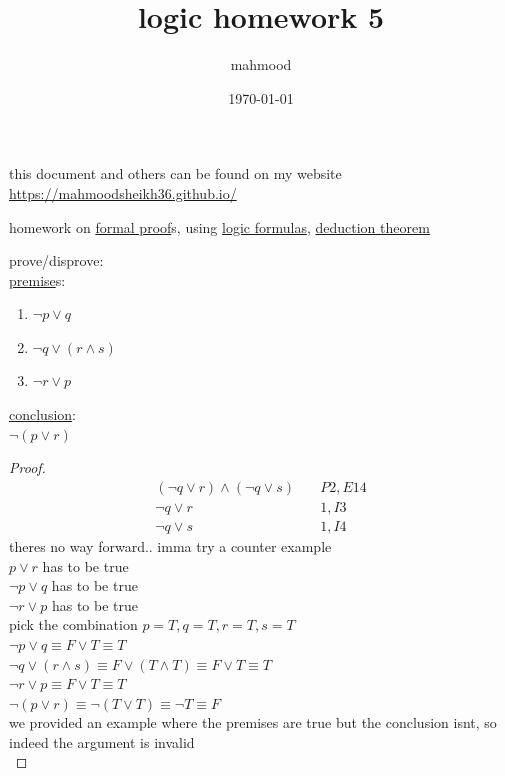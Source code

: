 \documentclass[a4paper,12pt]{article}
\author{mahmood}
\date{\today}
\title{logic homework 5}
\begin{document}
\maketitle
\begin{note}
this document and others can be found on my website\\
\url{https://mahmoodsheikh36.github.io/}
\end{note}
homework on \href{20230525071323-formal_proof.org}{formal proof}s, using \href{20230525082155-logic_formulas.org}{logic formulas}, \href{20230527163202-deduction_theorem.org}{deduction theorem}\\[0pt]
\begin{question}
prove/disprove:\\[0pt]
\href{20230524212241-premise.org}{premise}s:\\[0pt]
\begin{enumerate}
\item \(\lnot p \lor q\)\\[0pt]
\item \(\lnot q \lor (r \land s)\)\\[0pt]
\item \(\lnot r \lor p\)\\[0pt]
\end{enumerate}
\href{20230524212250-conclusion.org}{conclusion}:\\[0pt]
\(\lnot (p \lor r)\)\\[0pt]
\begin{proof}
\begin{align}
  (\lnot q \lor r) \land (\lnot q \lor s) &\quad P2,E14\\
  \lnot q \lor r &\quad 1,I3\\
  \lnot q \lor s &\quad 1,I4
\end{align}
theres no way forward.. imma try a counter example\\[0pt]
\(p \lor r\) has to be true\\[0pt]
\(\lnot p \lor q\) has to be true\\[0pt]
\(\lnot r \lor p\) has to be true\\[0pt]
pick the combination \(p=T,q=T,r=T,s=T\)\\[0pt]
\(\lnot p \lor q \equiv F \lor T \equiv T\)\\[0pt]
\(\lnot q \lor (r \land s) \equiv F \lor (T \land T) \equiv F \lor T \equiv T\)\\[0pt]
\(\lnot r \lor p \equiv F \lor T \equiv T\)\\[0pt]
\(\lnot (p \lor r) \equiv \lnot (T \lor T) \equiv \lnot T \equiv F\)\\[0pt]
we provided an example where the premises are true but the conclusion isnt, so indeed the argument is invalid\\[0pt]
\end{proof}
\end{question}
\end{document}
